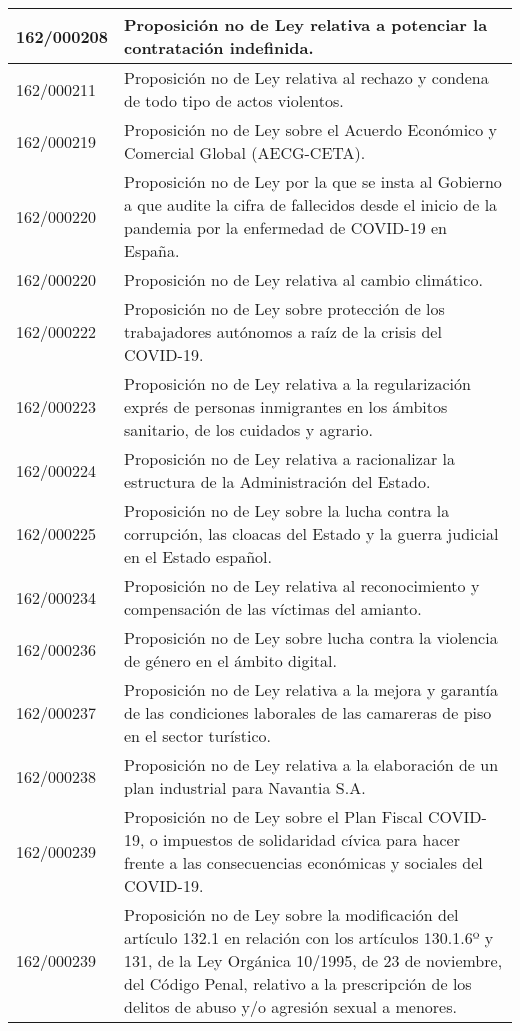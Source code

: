 {\begin{table}[H]
\begin{center}
\begin{tabularx}{\linewidth}{| l | X |}
162/000208 & Proposición no de Ley relativa a potenciar la contratación indefinida. \\
\hline
162/000211 & Proposición no de Ley relativa al rechazo y condena de todo tipo de actos violentos. \\
\hline
162/000219 & Proposición no de Ley sobre el Acuerdo Económico y Comercial Global (AECG-CETA). \\
\hline
162/000220 & Proposición no de Ley por la que se insta al Gobierno a que audite la cifra de fallecidos desde el inicio de la pandemia por la enfermedad de COVID-19 en España. \\
\hline
162/000220 & Proposición no de Ley relativa al cambio climático. \\
\hline
162/000222 & Proposición no de Ley sobre protección de los trabajadores autónomos a raíz de la crisis del COVID-19. \\
\hline
162/000223 & Proposición no de Ley relativa a la regularización exprés de personas inmigrantes en los ámbitos sanitario, de los cuidados y agrario. \\
\hline
162/000224 & Proposición no de Ley relativa a racionalizar la estructura de la Administración del Estado. \\
\hline
162/000225 & Proposición no de Ley sobre la lucha contra la corrupción, las cloacas del Estado y la guerra judicial en el Estado español. \\
\hline
162/000234 & Proposición no de Ley relativa al reconocimiento y compensación de las víctimas del amianto. \\
\hline
162/000236 & Proposición no de Ley sobre lucha contra la violencia de género en el ámbito digital. \\
\hline
162/000237 & Proposición no de Ley relativa a la mejora y garantía de las condiciones laborales de las camareras de piso en el sector turístico. \\
\hline
162/000238 & Proposición no de Ley relativa a la elaboración de un plan industrial para Navantia S.A. \\
\hline
162/000239 & Proposición no de Ley sobre el Plan Fiscal COVID-19, o impuestos de solidaridad cívica para hacer frente a las consecuencias económicas y sociales del COVID-19. \\
\hline
162/000239 & Proposición no de Ley sobre la modificación del artículo 132.1 en relación con los artículos 130.1.6º y 131, de la Ley Orgánica 10/1995, de 23 de noviembre, del Código Penal, relativo a la prescripción de los delitos de abuso y/o agresión sexual a menores. \\

\end{tabularx}
\end{center}
\end{table}}
